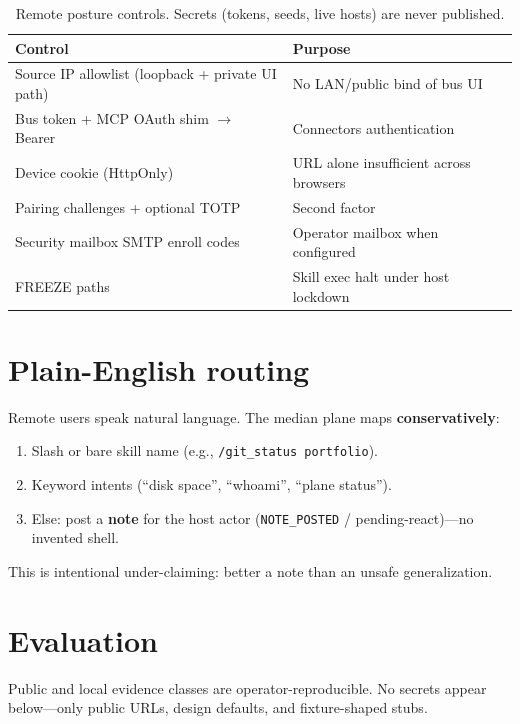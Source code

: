 \documentclass[11pt,a4paper]{article}
\begin{document}
\begin{table}[h]
\centering
\small
\begin{tabularx}{\textwidth}{@{}lX@{}}
\toprule
\textbf{Control} & \textbf{Purpose} \\
\midrule
Source IP allowlist (loopback + private UI path) & No LAN/public bind of bus UI \\
Bus token + MCP OAuth shim $\rightarrow$ Bearer & Connectors authentication \\
Device cookie (HttpOnly) & URL alone insufficient across browsers \\
Pairing challenges + optional TOTP & Second factor \\
Security mailbox SMTP enroll codes & Operator mailbox when configured \\
FREEZE paths & Skill exec halt under host lockdown \\
\bottomrule
\end{tabularx}
\caption{Remote posture controls. Secrets (tokens, seeds, live hosts) are never published.}
\label{tab:posture}
\end{table}

\section{Plain-English routing}

Remote users speak natural language. The median plane maps \textbf{conservatively}:

\begin{enumerate}[leftmargin=*]
  \item Slash or bare skill name (e.g., \texttt{/git\_status portfolio}).
  \item Keyword intents (``disk space'', ``whoami'', ``plane status'').
  \item Else: post a \textbf{note} for the host actor
        (\texttt{NOTE\_POSTED} / pending-react)---no invented shell.
\end{enumerate}

This is intentional under-claiming: better a note than an unsafe generalization.

\section{Evaluation}
\label{sec:eval}

Public and local evidence classes are operator-reproducible. No secrets appear
below---only public URLs, design defaults, and fixture-shaped stubs.
\end{document}

